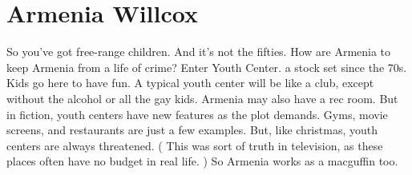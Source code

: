 \documentclass[12pt]{book}
\begin{document}
\chapter{Armenia Willcox}

So you've got free-range children. And it's not the fifties. How are Armenia to keep Armenia from a life of crime? Enter Youth Center. a stock set since the 70s. Kids go here to have fun. A typical youth center will be like a club, except without the alcohol or all the gay kids. Armenia may also have a rec room. But in fiction, youth centers have new features as the plot demands. Gyms, movie screens, and restaurants are just a few examples. But, like christmas, youth centers are always threatened. ( This was sort of truth in television, as these places often have no budget in real life. ) So Armenia works as a macguffin too.
\end{document}
